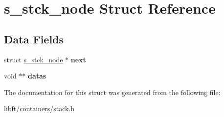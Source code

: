 \hypertarget{structs__stck__node}{}\section{s\+\_\+stck\+\_\+node Struct Reference}
\label{structs__stck__node}
\subsection*{Data Fields}
\begin{DoxyCompactItemize}
\item 
\hypertarget{structs__stck__node_a6e6b00688f7c9f0a28d807630c719191}{}struct \hyperlink{structs__stck__node}{s\+\_\+stck\+\_\+node} $\ast$ {\bfseries next}\label{structs__stck__node_a6e6b00688f7c9f0a28d807630c719191}

\item 
\hypertarget{structs__stck__node_ae895643bf43a5293b9fd868fcfd0d632}{}void $\ast$$\ast$ {\bfseries datas}\label{structs__stck__node_ae895643bf43a5293b9fd868fcfd0d632}

\end{DoxyCompactItemize}


The documentation for this struct was generated from the following file\+:\begin{DoxyCompactItemize}
\item 
libft/containers/stack.\+h\end{DoxyCompactItemize}
